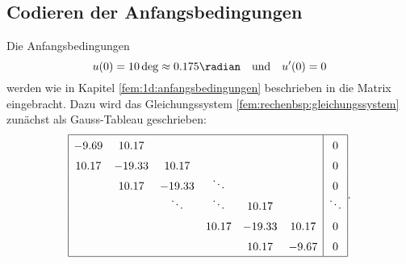 \subsection{Codieren der Anfangsbedingungen}
Die Anfangsbedingungen
\begin{equation}
    u(0) = 10 \deg \approx 0.175 \radian
    \quad \text{und} \quad
    u'(0) = 0
\end{equation}
werden wie in Kapitel \ref{fem:1d:anfangsbedingungen} beschrieben in die Matrix eingebracht.
Dazu wird das Gleichungssystem \ref{fem:rechenbsp:gleichungssystem} zunächst als Gauss-Tableau geschrieben:
\begin{equation}
    \def\arraystretch{1.5}
    \begin{array}{|cccccc|c|}
        \hline
        -9.69  & 10.17  &                &                &        &        & 0              \\
        10.17  &-19.33  & 10.17          &                &        &        & 0              \\
               & 10.17  &-19.33          & \smash{\ddots} &        &        & 0              \\
               &        & \smash{\ddots} & \smash{\ddots} & 10.17  &        & \smash{\ddots} \\
               &        &                & 10.17          &-19.33  & 10.17  & 0              \\
               &        &                &                & 10.17  & -9.67  & 0              \\
        \hline
    \end{array}.
\end{equation}

